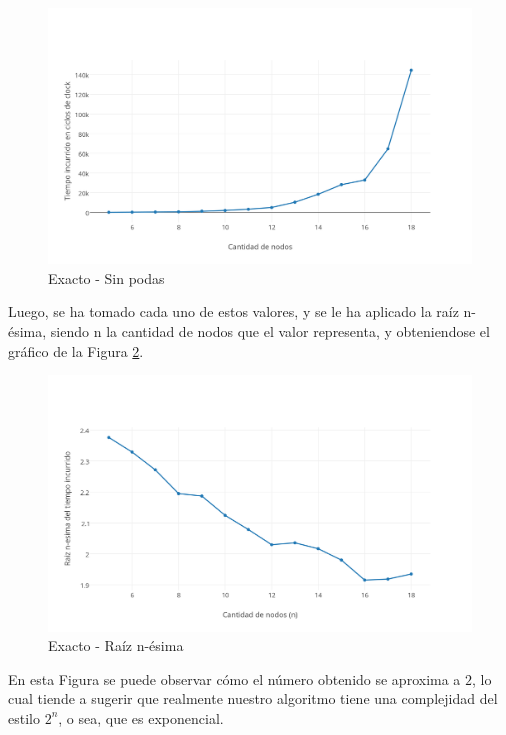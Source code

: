\begin{figure}[htb]
	\begin{center}
    		\includegraphics[scale=0.8]{imagenes/exacto-aleatorio-sin.png}
	\end{center}
	\caption{Exacto - Sin podas}\label{fig:1A}
\end{figure}

Luego, se ha tomado cada uno de estos valores, y se le ha aplicado la raíz n-ésima, siendo n la cantidad de nodos que el valor representa, y obteniendose el gráfico de la Figura \ref{fig:1B}.

\begin{figure}[htb]
	\begin{center}
    		\includegraphics[scale=0.8]{imagenes/exacto-aleatorio-sin-raiz.png}
	\end{center}
	\caption{Exacto - Raíz n-ésima}\label{fig:1B}
\end{figure}

En esta Figura se puede observar cómo el número obtenido se aproxima a $2$, lo cual tiende a sugerir que realmente nuestro algoritmo tiene una complejidad del estilo $2^n$, o sea, que es exponencial.

